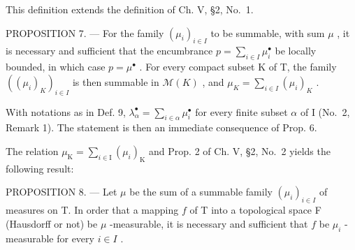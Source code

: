 This definition extends the definition of Ch. V, §2, No.~1.

PROPOSITION 7. --- For the family \((\mu_i)_{i \in I}\) to be summable, with sum \(\mu\) , it is necessary and sufficient that the encumbrance \(p = \sum_{i \in I} \mu_i^\bullet\) be locally bounded, in which case \(p = \mu^\bullet\) . For every compact subset K of T, the family \(\left((\mu_i)_K\right)_{i \in I}\) is then summable in \(\mathcal{M}(K)\) , and \(\mu_K = \sum_{i \in I} (\mu_i)_K\) .

With notations as in Def. 9, \(\lambda_{\alpha}^{\bullet} = \sum_{i\in \alpha}\mu_{i}^{\bullet}\) for every finite subset \(\alpha\) of I (No.~2, Remark 1). The statement is then an immediate consequence of Prop. 6.

The relation \(\mu_{\mathrm{K}} = \sum_{i\in \mathrm{I}}(\mu_i)_{\mathrm{K}}\) and Prop. 2 of Ch. V, §2, No.~2 yields the following result:

PROPOSITION 8. --- Let \(\mu\) be the sum of a summable family \((\mu_i)_{i \in I}\) of measures on T. In order that a mapping \(f\) of T into a topological space F (Hausdorff or not) be \(\mu\) -measurable, it is necessary and sufficient that \(f\) be \(\mu_i\) -measurable for every \(i \in I\) .

